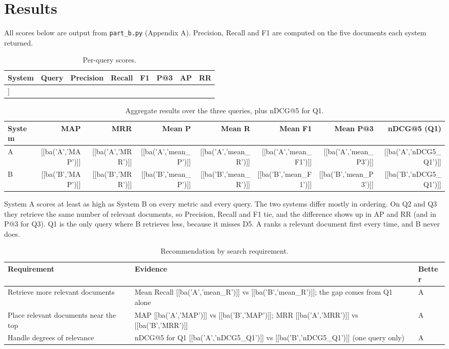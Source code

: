 
\section{Results}
All scores below are output from \texttt{part\_b.py} (Appendix A). Precision, Recall and F1 are computed on the five documents each system returned.
\begin{table}[H]\small\centering\caption{Per-query scores.}
\begin{tabular}{@{}llrrrrrr@{}}\toprule
System & Query & Precision & Recall & F1 & P@3 & AP & RR \\\midrule
[[t_b()]]
\bottomrule\end{tabular}\end{table}
\begin{table}[H]\small\centering\caption{Aggregate results over the three queries, plus nDCG@5 for Q1.}
\begin{tabular}{@{}lrrrrrrr@{}}\toprule
System & MAP & MRR & Mean P & Mean R & Mean F1 & Mean P@3 & nDCG@5 (Q1) \\\midrule
A & [[ba('A','MAP')]] & [[ba('A','MRR')]] & [[ba('A','mean_P')]] & [[ba('A','mean_R')]] & [[ba('A','mean_F1')]] & [[ba('A','mean_P3')]] & [[ba('A','nDCG5_Q1')]] \\
B & [[ba('B','MAP')]] & [[ba('B','MRR')]] & [[ba('B','mean_P')]] & [[ba('B','mean_R')]] & [[ba('B','mean_F1')]] & [[ba('B','mean_P3')]] & [[ba('B','nDCG5_Q1')]] \\
\bottomrule\end{tabular}\end{table}
System A scores at least as high as System B on every metric and every query. The two systems differ mostly in ordering. On Q2 and Q3 they retrieve the same number of relevant documents, so Precision, Recall and F1 tie, and the difference shows up in AP and RR (and in P@3 for Q3). Q1 is the only query where B retrieves less, because it misses D5. A ranks a relevant document first every time, and B never does.

\begin{table}[H]\small\centering\caption{Recommendation by search requirement.}
\begin{tabularx}{\linewidth}{@{}lYl@{}}\toprule
Requirement & Evidence & Better \\\midrule
Retrieve more relevant documents & Mean Recall [[ba('A','mean_R')]] vs [[ba('B','mean_R')]]; the gap comes from Q1 alone & A \\
Place relevant documents near the top & MAP [[ba('A','MAP')]] vs [[ba('B','MAP')]]; MRR [[ba('A','MRR')]] vs [[ba('B','MRR')]] & A \\
Handle degrees of relevance & nDCG@5 for Q1 [[ba('A','nDCG5_Q1')]] vs [[ba('B','nDCG5_Q1')]] (one query only) & A \\
\bottomrule\end{tabularx}\end{table}

